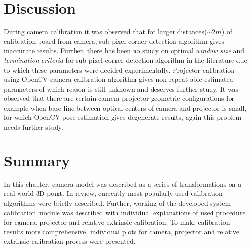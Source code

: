   
\section{Discussion}  
During camera calibration it was observed that for larger distances($\sim2m$) of calibration board from camera, sub-pixel corner detection algorithm gives inaccurate results. Further, there has been no study on optimal \textit{window size} and \textit{termination criteria} for sub-pixel corner detection algorithm in the literature due to which these parameters were decided experimentally.\newline  
\indent Projector calibration using OpenCV camera calibration algorithm gives non-repeat-able estimated parameters of which reason is still unknown and deserves further study.\newline  
\indent It was observed that there are certain camera-projector geometric configurations for example when base-line between optical centers of camera and projector is small, for which OpenCV pose-estimation gives degenerate results, again this problem needs further study.   
  
  
\section{Summary}  
In this chapter, camera model was described as a series of transformations on a real world 3D point. In review, currently most popularly used calibration algorithms were briefly described. Further, working of the developed system calibration module was described with individual explanations of used procedure for camera, projector and relative extrinsic calibration. To make calibration results more comprehensive, individual plots for camera, projector and relative extrinsic calibration process were presented.
 


